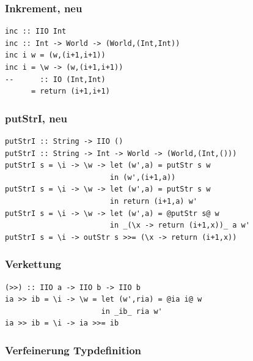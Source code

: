 		\subsubsection{Inkrement, neu} %
		\label{ssub:inkrement_neu}
		
			\lstHaskell
			\begin{lstlisting}
inc :: IIO Int
inc :: Int -> World -> (World,(Int,Int))
inc i w = (w,(i+1,i+1))
inc i = \w -> (w,(i+1,i+1))
--      :: IO (Int,Int)
      = return (i+1,i+1)
			\end{lstlisting}


		\subsubsection{putStrI, neu} %
		\label{ssub:putstri_neu}
		
			\lstHaskell
			\begin{lstlisting}
putStrI :: String -> IIO ()
putStrI :: String -> Int -> World -> (World,(Int,()))
putStrI s = \i -> \w -> let (w',a) = putStr s w
                        in (w',(i+1,a))
putStrI s = \i -> \w -> let (w',a) = putStr s w
                        in return (i+1,a) w'
putStrI s = \i -> \w -> let (w',a) = @putStr s@ w
                        in _(\x -> return (i+1,x))_ a w'
putStrI s = \i -> outStr s >>= (\x -> return (i+1,x))
			\end{lstlisting}


		\subsubsection{Verkettung} %
		\label{ssub:verkettung}
		
			\lstHaskell
			\begin{lstlisting}
(>>) :: IIO a -> IIO b -> IIO b
ia >> ib = \i -> \w = let (w',ria) = @ia i@ w
                      in _ib_ ria w'
ia >> ib = \i -> ia >>= ib
			\end{lstlisting}


		\subsubsection{Verfeinerung Typdefinition} %
		\label{ssub:verfeinerung_typdefinition}
		
